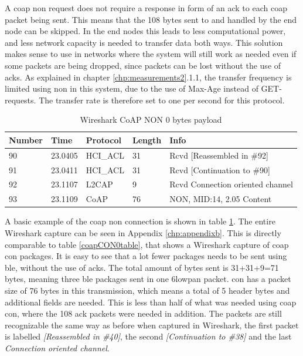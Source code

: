 \noindent A \gls{coap} \gls{non} request does not require a response in form of an \gls{ack} to each \gls{coap} packet being sent. This means that the 108 bytes sent to and handled by the end node can be skipped. In the end nodes this leads to less computational power, and less network capacity is needed to transfer data both ways. This solution makes sense to use in networks where the system will still work as needed even if some packets are being dropped, since packets can be lost without the use of \glspl{ack}. As explained in chapter \ref{chp:measurements2}.1.1, the transfer frequency is limited using \gls{non} in this system, due to the use of Max-Age instead of GET-requests. The transfer rate is therefore set to one per second for this protocol. 

\begin{table}[ht]
\small
\centering
\caption{Wireshark CoAP NON 0 bytes payload}
\label{coapNON0table}
\begin{tabular}{lllll}
\hline
Number & Time    & Protocol & Length & Info                             \\ \hline
90     & 23.0405 & HCI\_ACL & 31     & Rcvd {[}Reassembled in \#92{]}   \\
91     & 23.0411 & HCI\_ACL & 31     & Rcvd {[}Continuation to \#90{]}  \\
92     & 23.1107 & L2CAP    & 9      & Rcvd Connection oriented channel \\
93     & 23.1109 & CoAP     & 76     & NON, MID:14, 2.05 Content        \\ \hline
\end{tabular}
\end{table}


\noindent A basic example of the \gls{coap} \gls{non} connection is shown in table \ref{coapNON0table}. The entire Wireshark capture can be seen in Appendix \ref{chp:appendixb}. This is directly comparable to table \ref{coapCON0table}, that shows a Wireshark capture of \gls{coap} \gls{con} packages. It is easy to see that a lot fewer packages needs to be sent using \gls{ble}, without the use of \glspl{ack}. The total amount of bytes sent is 31+31+9=71 bytes, meaning three \gls{ble} packages sent in one \gls{6lowpan} packet. \gls{con} has a packet size of 76 bytes in this transmission, which means a total of 5 header bytes and additional fields are needed. This is less than half of what was needed using \gls{coap} \gls{con}, where the 108 \gls{ack} packets were needed in addition. The packets are still recognizable the same way as before when captured in Wireshark, the first packet is labelled \textit{[Reassembled in \#40]}, the second \textit{[Continuation to \#38]} and the last \textit{Connection oriented channel}.

